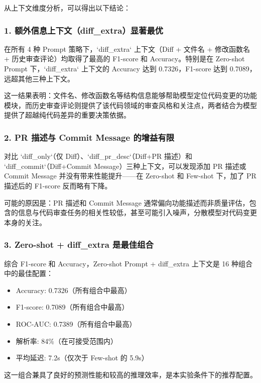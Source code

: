 \documentclass{experimentreport}
\begin{document}
{从上下文维度分析，可以得出以下结论：

\subsubsection*{1. 额外信息上下文（diff\_extra）显著最优}

在所有 4 种 Prompt 策略下，`diff_extra` 上下文（Diff + 文件名 + 修改函数名 + 历史审查评论）均取得了最高的 F1-score 和 Accuracy。特别是在 Zero-shot Prompt 下，`diff_extra` 上下文的 Accuracy 达到 0.7326，F1-score 达到 0.7089，远超其他三种上下文。

这一结果表明：文件名、修改函数名等结构信息能够帮助模型定位代码变更的功能模块，而历史审查评论则提供了该代码领域的审查风格和关注点，两者结合为模型提供了超越纯代码差异的重要决策依据。

\subsubsection*{2. PR 描述与 Commit Message 的增益有限}

对比 `diff_only`（仅 Diff）、`diff_pr_desc`（Diff+PR 描述）和 `diff_commit`（Diff+Commit Message）三种上下文，可以发现添加 PR 描述或 Commit Message 并没有带来性能提升——在 Zero-shot 和 Few-shot 下，加了 PR 描述后的 F1-score 反而略有下降。

可能的原因是：PR 描述和 Commit Message 通常偏向功能描述而非质量评估，包含的信息与代码审查任务的相关性较低，甚至可能引入噪声，分散模型对代码变更本身的关注。

\subsubsection*{3. Zero-shot + diff\_extra 是最佳组合}

综合 F1-score 和 Accuracy，Zero-shot Prompt + diff\_extra 上下文是 16 种组合中的最佳配置：

\begin{itemize}
  \item Accuracy: 0.7326（所有组合中最高）
  \item F1-score: 0.7089（所有组合中最高）
  \item ROC-AUC: 0.7389（所有组合中最高）
  \item 解析率: 84\%（在可接受范围内）
  \item 平均延迟: 7.2s（仅次于 Few-shot 的 5.9s）
\end{itemize}

这一组合兼具了良好的预测性能和较高的推理效率，是本实验条件下的推荐配置。

}
\end{document}
